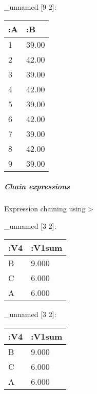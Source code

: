 \documentclass[]{article}
\newenvironment{Shaded}{\begin{snugshade}}{\end{snugshade}}
\newcommand{\KeywordTok}[1]{\textcolor[rgb]{0.13,0.29,0.53}{\textbf{#1}}}
\newcommand{\DecValTok}[1]{\textcolor[rgb]{0.00,0.00,0.81}{#1}}
\newcommand{\VariableTok}[1]{\textcolor[rgb]{0.00,0.00,0.00}{#1}}
\newcommand{\AttributeTok}[1]{\textcolor[rgb]{0.77,0.63,0.00}{#1}}
\newcommand{\NormalTok}[1]{#1}
\let\oldsubparagraph\subparagraph
\renewcommand{\subparagraph}[1]{\oldsubparagraph{#1}\mbox{}}
\begin{document}
\_unnamed {[}9 2{]}:

\begin{longtable}[]{@{}ll@{}}
\toprule
:A & :B\tabularnewline
\midrule
\endhead
1 & 39.00\tabularnewline
2 & 42.00\tabularnewline
3 & 39.00\tabularnewline
4 & 42.00\tabularnewline
5 & 39.00\tabularnewline
6 & 42.00\tabularnewline
7 & 39.00\tabularnewline
8 & 42.00\tabularnewline
9 & 39.00\tabularnewline
\bottomrule
\end{longtable}

\subparagraph{Chain expressions}\label{chain-expressions}

Expression chaining using \textgreater{}

\begin{Shaded}
\end{Shaded}

\_unnamed {[}3 2{]}:

\begin{longtable}[]{@{}ll@{}}
\toprule
:V4 & :V1sum\tabularnewline
\midrule
\endhead
B & 9.000\tabularnewline
C & 6.000\tabularnewline
A & 6.000\tabularnewline
\bottomrule
\end{longtable}

\begin{Shaded}
\end{Shaded}

\_unnamed {[}3 2{]}:

\begin{longtable}[]{@{}ll@{}}
\toprule
:V4 & :V1sum\tabularnewline
\midrule
\endhead
B & 9.000\tabularnewline
C & 6.000\tabularnewline
A & 6.000\tabularnewline
\bottomrule
\end{longtable}
\end{document}
